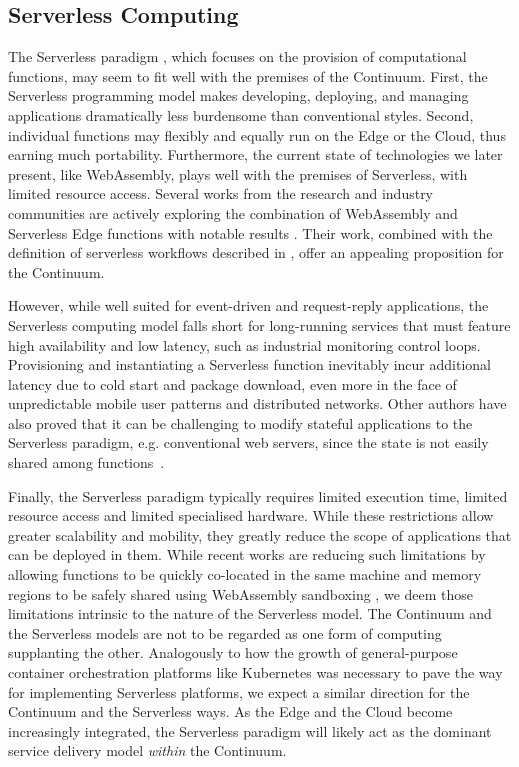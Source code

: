 \subsection{Serverless Computing}

The Serverless paradigm \cite{shafiei2022serverless}, which focuses on the provision of computational functions, may seem to fit well with the premises of the Continuum. First, the Serverless programming model makes developing, deploying, and managing applications dramatically less burdensome than conventional styles.
Second, individual functions may flexibly and equally run on the Edge or the Cloud, thus earning much portability. Furthermore, the current state of technologies we later present, like WebAssembly, plays well with the premises of Serverless, with limited resource access. Several works from the research and industry communities are actively exploring the combination of WebAssembly and Serverless Edge functions with notable results \cite{gadepalli2020sledge, hall2019execution, shillaker2020faasm}. Their work, combined with the definition of serverless workflows described in \cite{risco2021serverless}, offer an appealing proposition for the Continuum.

However, while well suited for event-driven and request-reply applications, the Serverless computing model falls short for long-running services that must feature high availability and low latency, such as industrial monitoring control loops. Provisioning and instantiating a Serverless function inevitably incur additional latency due to cold start and package download, even more in the face of unpredictable mobile user patterns and distributed networks. Other authors have also proved that it can be challenging to modify stateful applications to the Serverless paradigm, e.g. conventional web servers, since the state is not easily shared among functions~\cite{MALAWSKI2020502}.

Finally, the Serverless paradigm typically requires limited execution time, limited resource access and limited specialised hardware. While these restrictions allow greater scalability and mobility, they greatly reduce the scope of applications that can be deployed in them. While recent works are reducing such limitations by allowing functions to be quickly co-located in the same machine and memory regions to be safely shared using WebAssembly sandboxing \cite{shillaker2020faasm}, we deem those limitations intrinsic to the nature of the Serverless model.
The Continuum and the Serverless models are not to be regarded as one form of computing supplanting the other. Analogously to how the growth of general-purpose container orchestration platforms like Kubernetes was necessary to pave the way for implementing Serverless platforms, we expect a similar direction for the Continuum and the Serverless ways. 
As the Edge and the Cloud become increasingly integrated, the Serverless paradigm will likely act as the dominant service delivery model \textit{within} the Continuum.

